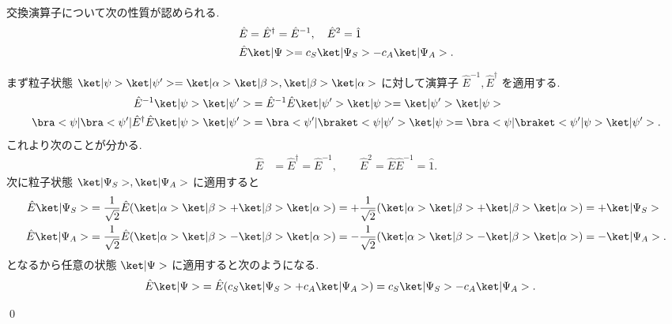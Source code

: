 \documentclass[uplatex,dvipdfmx,a4paper,11pt]{jlreq}
\makeatletter
\numberwithin{equation}{section}
\theoremstyle{definition}
\renewenvironment{proof}[1][\proofname]{\par
  \normalfont
  \topsep6\p@\@plus6\p@ \trivlist
  \item[\hskip\labelsep{\bfseries #1}\@addpunct{\bfseries}]\ignorespaces\quad\par
}{
  \qed\endtrivlist\@endpefalse
}
\renewcommand\proofname{証明}
\makeatother
\begin{document}
\begin{proposition}[Q21-1(iii)(iv)(v)]
  交換演算子について次の性質が認められる.
  \begin{align}
     & \hat{E} = \hat{E}^\dagger = \hat{E}^{-1}, \quad \hat{E}^2 = \hat{1} \\
     & \hat{E}\ket|\Psi> = c_S\ket|\Psi_S> - c_A\ket|\Psi_A>.
  \end{align}
\end{proposition}
\begin{proof}
  まず粒子状態 $\ket|\psi>\ket|\psi'> = \ket|\alpha>\ket|\beta>, \ket|\beta>\ket|\alpha>$ に対して演算子 $\hat{E}^{-1}, \hat{E}^\dagger$ を適用する.
  \begin{align}
    \hat{E}^{-1}\ket|\psi>\ket|\psi'>                                & = \hat{E}^{-1}\hat{E}\ket|\psi'>\ket|\psi> = \ket|\psi'>\ket|\psi>                     \\
    \bra<\psi|\bra<\psi'|\hat{E}^\dagger\hat{E}\ket|\psi>\ket|\psi'> & = \bra<\psi'|\braket<\psi|\psi'>\ket|\psi> = \bra<\psi|\braket<\psi'|\psi>\ket|\psi'>.
  \end{align}
  これより次のことが分かる.
  \begin{align}
    \hat{E} & = \hat{E}^\dagger = \hat{E}^{-1}, \qquad \hat{E}^2 = \hat{E}\hat{E}^{-1} = \hat{1}.
  \end{align}
  次に粒子状態 $\ket|\Psi_S>, \ket|\Psi_A>$ に適用すると
  \begin{align}
    \hat{E}\ket|\Psi_S> & = \frac{1}{\sqrt{2}}\hat{E}(\ket|\alpha>\ket|\beta> + \ket|\beta>\ket|\alpha>) = +\frac{1}{\sqrt{2}}(\ket|\alpha>\ket|\beta> + \ket|\beta>\ket|\alpha>) = +\ket|\Psi_S>  \\
    \hat{E}\ket|\Psi_A> & = \frac{1}{\sqrt{2}}\hat{E}(\ket|\alpha>\ket|\beta> - \ket|\beta>\ket|\alpha>) = -\frac{1}{\sqrt{2}}(\ket|\alpha>\ket|\beta> - \ket|\beta>\ket|\alpha>) = -\ket|\Psi_A>.
  \end{align}
  となるから任意の状態 $\ket|\Psi>$ に適用すると次のようになる.
  \begin{align}
    \hat{E}\ket|\Psi> & = \hat{E}(c_S\ket|\Psi_S> + c_A\ket|\Psi_A>) = c_S\ket|\Psi_S> - c_A\ket|\Psi_A>.
  \end{align}
\end{proof}
\end{document}
